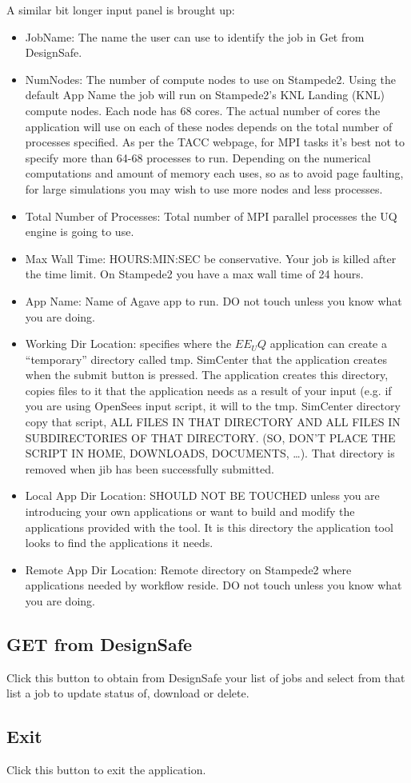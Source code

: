 A similar bit longer input panel is brought up:
\begin{itemize}
\item JobName: The name the user can use to identify the job in Get from DesignSafe.
\item NumNodes: The number of compute nodes to use on Stampede2. Using the default App Name the job will run on Stampede2’s KNL Landing (KNL) 
compute nodes. Each node has 68 cores. The actual number of cores the application will use on each of these nodes depends on the total number of 
processes specified. As per the TACC webpage, for MPI tasks it’s best not to specify more than 64-68 processes to run. Depending on the numerical 
computations and amount of memory each uses, so as to avoid page faulting, for large simulations you may wish to use more nodes and less processes.
\item Total Number of Processes: Total number of MPI parallel processes the UQ engine is going to use.
\item Max Wall Time:  HOURS:MIN:SEC be conservative. Your job is killed after the time limit. On Stampede2 you have a max wall time of 24 hours.
\item App Name:   Name of Agave app to run. DO not touch unless you know what you are doing.
\item Working Dir Location: specifies where the $EE_UQ$ application can create a “temporary” directory called tmp. SimCenter that the application 
creates when the submit button is pressed. The application creates this directory, copies files to it that the application needs as a result of your 
input (e.g. if you are using OpenSees input script, it will to the tmp. SimCenter directory copy that script, ALL FILES IN THAT DIRECTORY AND ALL FILES 
IN SUBDIRECTORIES OF THAT DIRECTORY. (SO, DON’T PLACE THE SCRIPT IN HOME, DOWNLOADS, DOCUMENTS, …). That directory is removed when jib has been successfully submitted.
\item Local App Dir Location: SHOULD NOT BE TOUCHED unless you are introducing your own applications or want to build and modify the applications 
provided with the tool. It is this directory the application tool looks to find the applications it needs.
\item Remote App Dir Location: Remote directory on Stampede2 where applications needed by workflow reside. DO not touch unless you know what you are doing.

\end{itemize}


\subsection{GET from DesignSafe}
	Click this button to obtain from DesignSafe your list of jobs and select from that list a job to update status of, download or delete.

\subsection{Exit}
Click this button to exit the application. 
